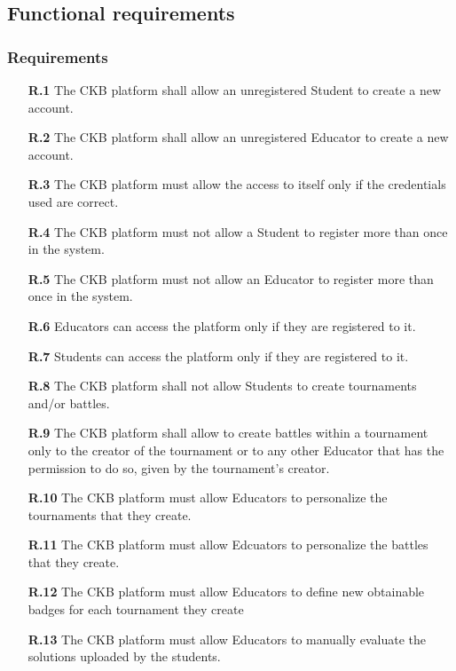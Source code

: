 \documentclass{article}
\begin{document}
{\subsection{Functional requirements}
    \subsubsection{Requirements}
        \begin{itemize}
            
            \item[\textbf{R.1}] The CKB platform shall allow an unregistered Student to create a new account.
            \item[\textbf{R.2}] The CKB platform shall allow an unregistered Educator to create a new account.
            \item[\textbf{R.3}] The CKB platform must allow the access to itself only if the credentials used are correct.                
            \item[\textbf{R.4}] The CKB platform must not allow a Student to register more than once in the system.
            \item[\textbf{R.5}] The CKB platform must not allow an Educator to register more than once in the system.
            \item[\textbf{R.6}] Educators can access the platform only if they are registered to it.
            \item[\textbf{R.7}] Students can access the platform only if they are registered to it.
            \item[\textbf{R.8}] The CKB platform shall not allow Students to create tournaments and/or battles.
            \item[\textbf{R.9}] The CKB platform shall allow to create battles within a tournament only to the creator of
            the tournament or to any other Educator that has the permission to do so, given by the tournament's creator.
            \item[\textbf{R.10}] The CKB platform must allow Educators to personalize the tournaments that they create.
            \item[\textbf{R.11}] The CKB platform must allow Edcuators to personalize the battles that they create.
            \item[\textbf{R.12}] The CKB platform must allow Educators to define new obtainable badges for each tournament they
            create
            \item[\textbf{R.13}] The CKB platform must allow Educators to manually evaluate the solutions uploaded by the students.

\end{itemize}}
\end{document}
